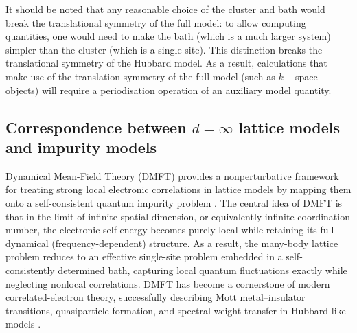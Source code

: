 It should be noted that any reasonable choice of the cluster and bath would break the translational symmetry of the full model: to allow computing quantities, one would need to make the bath (which is a much larger system) simpler than the cluster (which is a single site). This distinction breaks the translational symmetry of the Hubbard model. As a result, calculations that make use of the translation symmetry of the full model (such as \(k-\)space objects) will require a periodisation operation of an auxiliary model quantity.

\subsection{Correspondence between $d=\infty$ lattice models and impurity models}

Dynamical Mean-Field Theory (DMFT) provides a nonperturbative framework for treating strong local electronic correlations in lattice models by mapping them onto a self-consistent quantum impurity problem \cite{metzner_volhardt_1989,georges1996}. The central idea of DMFT is that in the limit of infinite spatial dimension, or equivalently infinite coordination number, the electronic self-energy becomes purely local while retaining its full dynamical (frequency-dependent) structure. As a result, the many-body lattice problem reduces to an effective single-site problem embedded in a self-consistently determined bath, capturing local quantum fluctuations exactly while neglecting nonlocal correlations. DMFT has become a cornerstone of modern correlated-electron theory, successfully describing Mott metal--insulator transitions, quasiparticle formation, and spectral weight transfer in Hubbard-like models \cite{georges1996,georges_2004_dmft}.

